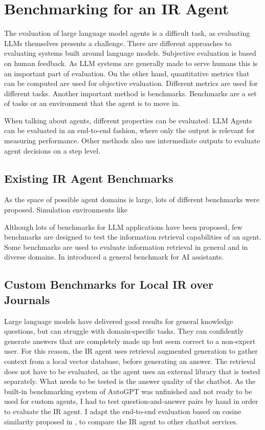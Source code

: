 \documentclass[../main.tex]{subfiles}
\begin{document}
\chapter{Benchmarking for an IR Agent}
\label{ch:benchmarks}

The evaluation of large language model agents is a difficult task,
as evaluating LLMs themselves presents a challenge.
There are different approaches to evaluating systems built around language models.
Subjective evaluation is based on human feedback.
As LLM systems are generally made to serve humans this is an important part of evaluation.
On the other hand,
quantitative metrics that can be computed are used for objective evaluation.
Different metrics are used for different tasks. Another important method is benchmarks.
Benchmarks are a set of tasks or an environment that the agent is to move in.

When talking about agents, different properties can be evaluated.
LLM Agents can be evaluated in an end-to-end fashion, where only the output is
relevant for measuring performance.
Other methods also use intermediate outputs to evaluate agent decisions on a step level.

\section{Existing IR Agent Benchmarks}

As the space of possible agent domains is large, lots of different benchmarks were proposed.
Simulation environments like

Although lots of benchmarks for LLM applications have been proposed,
few benchmarks are designed to test the information retrieval capabilities of an agent.
Some benchmarks are used to evaluate information retrieval in general and in diverse domains. %
In \autocite{Mialon2023} introduced a general benchmark for AI assistants.

\section{Custom Benchmarks for Local IR over Journals}

Large language models have delivered good results for general knowledge questions,
but can struggle with domain-specific tasks.
They can confidently generate answers that are completely made up but seem correct to a non-expert user.
For this reason, the IR agent uses retrieval augmented generation to gather context from a local vector database,
before generating an answer.
The retrieval does not have to be evaluated, as the agent uses an external library that is tested separately.
What needs to be tested is the answer quality of the chatbot.
As the built-in benchmarking system of AutoGPT was unfinished and not ready to be used for custom agents,
I had to test question-and-answer pairs by hand in order to evaluate the IR agent.
I adapt the end-to-end evaluation based on cosine similarity proposed in \cite{Banerjee2023},
to compare the IR agent to other chatbot services.
\end{document}
